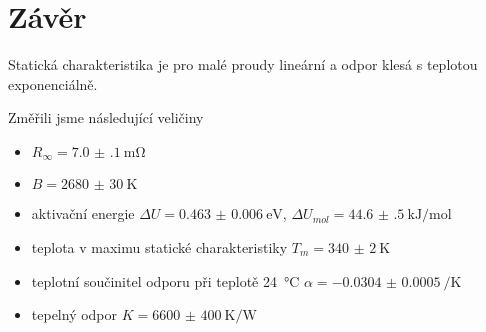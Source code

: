 \section*{Závěr}
Statická charakteristika je pro malé proudy lineární a odpor klesá s teplotou exponenciálně.

Změřili jsme následující veličiny
\begin{itemize}
\item $R_\infty = \SI{7.0(1)}{\milli\ohm}$
\item $B = \SI{2680(30)}{\kelvin}$
\item aktivační energie $\Delta U = \SI{0.463(6)}{\electronvolt}$, $\Delta U_{mol} = \SI{44.6(5)}{\kilo\joule\per\mole}$
\item teplota v maximu statické charakteristiky $T_m = \SI{340(2)}{\kelvin}$
\item teplotní součinitel odporu při teplotě \SI{24}{\degreeCelsius} $\alpha = \SI{-0.0304(5)}{\per\kelvin}$
\item tepelný odpor $K = \SI{6600(400)}{\kelvin\per\watt}$
\end{itemize}